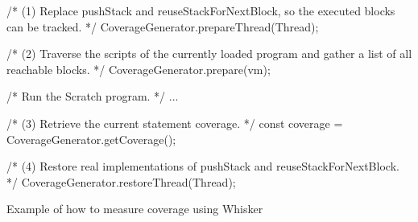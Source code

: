 
\begin{listing}[htpb]
    \centering

    \begin{minipage}{.75\textwidth}
        \begin{javascriptcode}
            /* (1) Replace pushStack and reuseStackForNextBlock,
               so the executed blocks can be tracked. */
            CoverageGenerator.prepareThread(Thread);

            /* (2) Traverse the scripts of the currently loaded program
               and gather a list of all reachable blocks. */
            CoverageGenerator.prepare(vm);

            /* Run the Scratch program. */
            ...

            /* (3) Retrieve the current statement coverage. */
            const coverage = CoverageGenerator.getCoverage();

            /* (4) Restore real implementations of pushStack and
               reuseStackForNextBlock. */
            CoverageGenerator.restoreThread(Thread);
        \end{javascriptcode}
    \end{minipage}

    \caption{Example of how to measure coverage using Whisker}
    \label{fig:measuring_coverage}
\end{listing}

